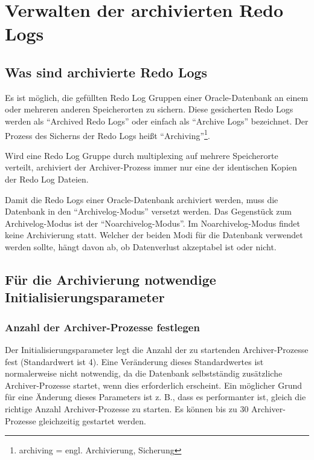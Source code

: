     \section{Verwalten der archivierten Redo Logs}
    \label{administeringarchivelogs}
      \subsection{Was sind archivierte Redo Logs}
        Es ist m\"oglich, die gef\"ullten Redo Log Gruppen einer Oracle-Datenbank an einem oder mehreren anderen Speicherorten zu sichern. Diese gesicherten Redo Logs werden als \enquote{Archived Redo Logs} oder einfach als \enquote{Archive Logs} bezeichnet. Der Prozess des Sicherns der Redo Logs hei\ss{}t \enquote{Archiving}\footnote{archiving = engl. Archivierung, Sicherung}.
        \begin{merke}
          Wird eine Redo Log Gruppe durch multiplexing auf mehrere Speicherorte verteilt, archiviert der Archiver-Prozess immer nur eine der identischen Kopien der Redo Log Dateien.
        \end{merke}
        Damit die Redo Logs einer Oracle-Datenbank archiviert werden, muss die Datenbank in den \enquote{Archivelog-Modus} versetzt werden. Das Gegenst\"uck zum Archivelog-Modus ist der \enquote{Noarchivelog-Modus}. Im Noarchivelog-Modus findet keine Archivierung statt.
        Welcher der beiden Modi f\"ur die Datenbank verwendet werden sollte, h\"angt davon ab, ob Datenverlust akzeptabel ist oder nicht.

      \subsection{F\"ur die Archivierung notwendige Initialisierungsparameter}
        \subsubsection{Anzahl der Archiver-Prozesse festlegen}
          Der Initialisierungsparameter  legt die Anzahl der zu startenden Archiver-Prozesse fest (Standardwert ist 4). Eine Ver\"anderung dieses Standardwertes ist normalerweise nicht notwendig, da die Datenbank selbstst\"andig zus\"atzliche Archiver-Prozesse startet, wenn dies erforderlich erscheint.
\clearpage
					Ein m\"oglicher Grund f\"ur eine \"Anderung dieses Parameters ist z. B., dass es  performanter ist, gleich die richtige Anzahl Archiver-Prozesse zu starten. Es k\"onnen bis zu 30 Archiver-Prozesse gleichzeitig gestartet werden.

